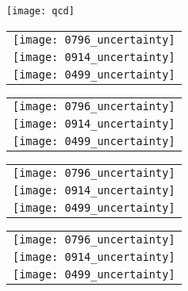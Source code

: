\begin{figure}
  \centering

  \begin{subfigure}{0.18\linewidth}
    \texttt{[image: qcd]}
    \caption{\label{fig:all_uncertainties}}
  \end{subfigure}
  \begin{subfigure}{0.194\linewidth}
    \begin{tabular}{c}
      \texttt{[image: 0796\_uncertainty]} \\
      \texttt{[image: 0914\_uncertainty]} \\
      \texttt{[image: 0499\_uncertainty]} \\
    \end{tabular}
    \caption{\label{fig:uncertainty_mri}}
  \end{subfigure}
  \begin{subfigure}{0.194\linewidth}
    \begin{tabular}{c}
      \texttt{[image: 0796\_uncertainty]} \\
      \texttt{[image: 0914\_uncertainty]} \\
      \texttt{[image: 0499\_uncertainty]} \\
    \end{tabular}
    \caption{\label{fig:uncertainty_std}}
  \end{subfigure}
  \begin{subfigure}{0.194\linewidth}
    \begin{tabular}{c}
      \texttt{[image: 0796\_uncertainty]} \\
      \texttt{[image: 0914\_uncertainty]} \\
      \texttt{[image: 0499\_uncertainty]} \\
    \end{tabular}
    \caption{\label{fig:uncertainty_mean}}
  \end{subfigure}
  \begin{subfigure}{0.194\linewidth}
    \begin{tabular}{c}
      \texttt{[image: 0796\_uncertainty]} \\
      \texttt{[image: 0914\_uncertainty]} \\
      \texttt{[image: 0499\_uncertainty]} \\
    \end{tabular}
    \caption{\label{fig:uncertainty_pseudo}}
  \end{subfigure}


\end{figure}
